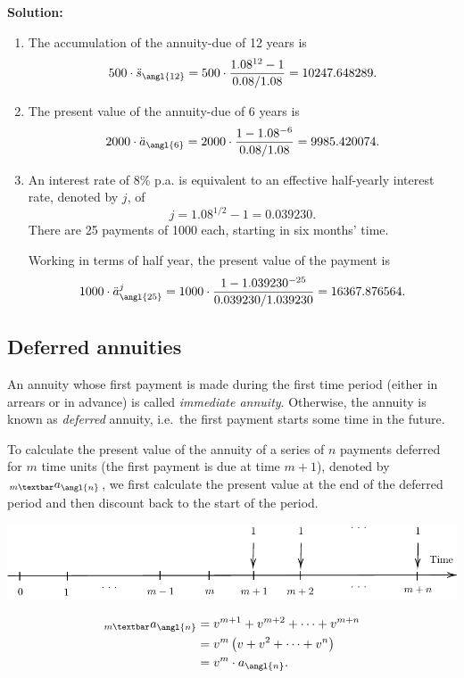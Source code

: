\documentclass[
]{book}
\theoremstyle{definition}
\theoremstyle{definition}
\theoremstyle{definition}
\theoremstyle{definition}
\theoremstyle{remark}
\begin{document}
\textbf{Solution:}

\begin{enumerate}
\def\labelenumi{\arabic{enumi}.}
\item
  The accumulation of the annuity-due of 12 years is
  \[500 \cdot \ddot{s}_\angl{12} = 500 \cdot \frac{1.08^{12} -1}{0.08/1.08} = 10247.648289.\]
\item
  The present value of the annuity-due of 6 years is
  \[2000 \cdot \ddot{a}_\angl{6} = 2000 \cdot \frac{1- 1.08^{-6}}{0.08/1.08} = 9985.420074.\]
\item
  An interest rate of 8\% p.a. is equivalent to an effective
  half-yearly interest rate, denoted by \(j\), of
  \[j = 1.08^{1/2} -1 = 0.039230.\] There are 25 payments of 1000
  each, starting in six months' time.

  Working in terms of half year, the present value of the payment is
  \[1000 \cdot \ddot{a}^j_\angl{25} = 1000 \cdot \frac{1 - 1.039230^{-25} }{0.039230/1.039230 } = 16367.876564.\]
\end{enumerate}

\subsection{Deferred annuities}\label{deferred-annuities}

An annuity whose first payment is made during the first time period
(either in arrears or in advance) is called \emph{immediate annuity}.
Otherwise, the annuity is known as \emph{deferred} annuity, i.e.~the first
payment starts some time in the future.

To calculate the present value of the annuity of a series of \(n\)
payments deferred for \(m\) time units (the first payment is due at time
\(m+1\)), denoted by \(_{m \textbar}a_\angl{n}\), we first calculate the
present value at the end of the deferred period and then discount back
to the start of the period.

\begin{center}\includegraphics{SCMA266Bookdownproj_files/figure-latex/tikz-ex17-1} \end{center}

\[\begin{aligned}
    _{m \textbar} a_\angl{n}  &= v^{m+1} + v^{m+2} + \cdots +v^{m+n}  \\
    &= v^m  \left( v + v^2 + \cdots + v^n  \right) \\
    &= v^m \cdot  a_\angl{n}.\end{aligned}\]
\end{document}
